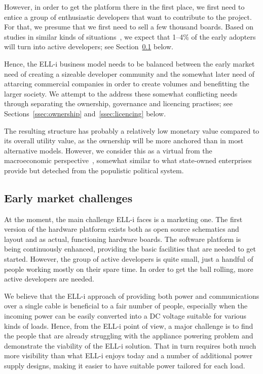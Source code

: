 \documentclass[draft,a4paper]{siamltex}
\begin{document}
However, in order to get the platform there in the first place, we
first need to entice a group of enthusiastic developers that want to
contribute to the project.  For that, we presume that we first need to
sell a few thousand boards.  Based on studies in similar kinds of
situations~\cite{need-reference}, we expect that 1--4\% of the early
adopters will turn into active developers; see
Section~\ref{ssec:earlymarket} below.

Hence, the ELL-i business model needs to be balanced between the early
market need of creating a sizeable developer community and the
somewhat later need of attarcing commercial companies in order to
create volumes and benefitting the larger society.  We attempt to the
address these somewhat conflicting needs through separating the
ownership, governance and licencing practises; see
Sections~\ref{ssec:ownership} and~\ref{ssec:licencing} below.

The resulting structure has probably a relatively low monetary value
compared to its overall utility value, as the ownership will be more
anchored than in most alternative models.  However, we consider this
as a virtual from the macroeconomic
perspective~\cite{Olson2002}, somewhat similar to what
state-owned enterprises provide but deteched from the populistic
political system.

\subsection{Early market challenges}
\label{ssec:earlymarket}

At the moment, the main challenge ELL-i faces is a marketing one.  The
first version of the hardware platform exists both as open source
schematics and layout and as actual, functioning hardware boards.  The
software platform is being continuously enhanced, providing the basic
facilities that are needed to get started.  However, the group of
active developers is quite small, just a handful of people working
mostly on their spare time.  In order to get the ball rolling, more
active developers are needed.

We believe that the ELL-i approach of providing both power and
communications over a single cable is beneficial to a fair number of
people, especially when the incoming power can be easily converted
into a DC voltage suitable for various kinds of loads.  Hence, from
the ELL-i point of view, a major challenge is to find the people that
are already struggling with the appliance powering problem and
demonstrate the viability of the ELL-i solution.  That in turn
requires both much more visibility than what ELL-i enjoys today and a
number of additional power supply designs, making it easier to have
suitable power tailored for each load.
\end{document}
